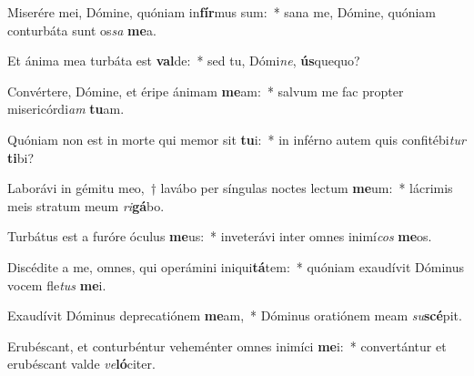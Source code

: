 \item Miserére mei, Dómine, quóniam in\textbf{fír}mus sum:~* sana me, Dómine, quóniam conturbáta sunt os\textit{sa} \textbf{me}a.
\item Et ánima mea turbáta est \textbf{val}de:~* sed tu, Dómi\textit{ne}, \textbf{ús}quequo?
\item Convértere, Dómine, et éripe ánimam \textbf{me}am:~* salvum me fac propter misericórdi\textit{am} \textbf{tu}am.
\item Quóniam non est in morte qui memor sit \textbf{tu}i:~* in inférno autem quis confitébi\textit{tur} \textbf{ti}bi?
\item Laborávi in gémitu meo,~† lavábo per síngulas noctes lectum \textbf{me}um:~* lácrimis meis stratum meum \textit{ri}\textbf{gá}bo.
\item Turbátus est a furóre óculus \textbf{me}us:~* inveterávi inter omnes inimí\textit{cos} \textbf{me}os.
\item Discédite a me, omnes, qui operámini iniqui\textbf{tá}tem:~* quóniam exaudívit Dóminus vocem fle\textit{tus} \textbf{me}i.
\item Exaudívit Dóminus deprecatiónem \textbf{me}am,~* Dóminus oratiónem meam \textit{su}\textbf{scé}pit.
\item Erubéscant, et conturbéntur veheménter omnes inimíci \textbf{me}i:~* convertántur et erubéscant valde \textit{ve}\textbf{ló}citer.
